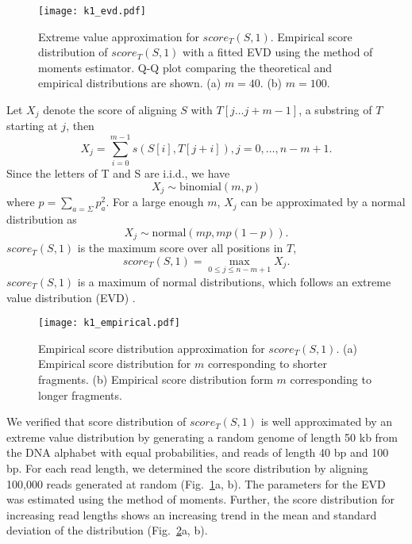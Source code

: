 \begin{figure}[t!]
\centering
\texttt{[image: k1\_evd.pdf]}
\caption[Extreme value distribution approximation for $score_T(S,1)$]{
  Extreme value approximation for $score_T(S,1)$.
  Empirical score distribution of $score_T(S,1)$ with a fitted
  EVD using the method of moments estimator.
  Q-Q plot comparing the theoretical and empirical distributions are shown.
  (a) $m=40$.
  (b) $m=100$.}
\label{evd_approx}
\end{figure}

Let $X_j$ denote the score of aligning $S$ with $T[j \dots j+m-1]$, a
substring of $T$ starting at $j$, then \[X_j = \sum_{i=0}^{m-1}
s(S[i],T[j+i]), j = 0, \dots, n-m+1.\] Since the letters of T and S
are i.i.d., we have \[X_j \sim \text{binomial}(m,p)\] where $p = \sum_{a=\Sigma}
p_a^2$.  For a large enough $m$, $X_j$ can be approximated by a normal
distribution as \[X_j \sim \text{normal}(mp, mp(1-p)).  \] $score_T(S,1)$ is the
maximum score over all positions in $T$, \[score_T(S,1) = \max_{0 \leq j
\leq n-m+1} X_j.\] $score_T(S,1)$ is a maximum of normal distributions,
which follows an extreme value distribution (EVD)
\citep{kotz2000extreme}.

\begin{figure}[t!]
\centering
\texttt{[image: k1\_empirical.pdf]}
\caption[Empirical score distribution for $score_T(S,1)$]{
  Empirical score distribution approximation for $score_T(S,1)$.
  (a) Empirical score distribution for $m$ corresponding to shorter
  fragments.
  (b) Empirical score distribution form $m$ corresponding to longer
  fragments.}
\label{evd_empirical}
\end{figure}

We verified that score distribution of $score_T(S,1)$ is well
approximated by an extreme value distribution by generating a random
genome of length 50 kb from the DNA alphabet with equal probabilities,
and reads of length 40 bp and 100 bp. For each read length, we
determined the score distribution by aligning 100,000 reads generated at
random (Fig.~\ref{evd_approx}a, b). The parameters for the EVD was
estimated using the method of moments.
Further, the score distribution for increasing read lengths shows an
increasing trend in the mean and standard deviation of the distribution
(Fig.~\ref{evd_empirical}a, b).


